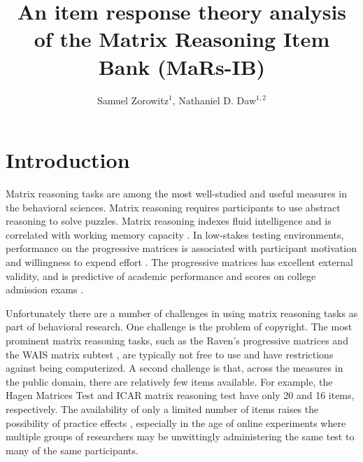 \documentclass[a4paper,man,natbib]{apa6}
\title{An item response theory analysis of the Matrix Reasoning Item Bank (MaRs-IB)}
\author{Samuel Zorowitz$^1$, Nathaniel D. Daw$^{1,2}$}
\affiliation{$^1$Princeton Neuroscience Institute, Princeton University, USA\\$^2$Department of Psychology, Princeton University, USA}
\begin{document}
\maketitle

\section{Introduction}

Matrix reasoning tasks are among the most well-studied and useful measures in the behavioral sciences. Matrix reasoning requires participants to use abstract reasoning to solve puzzles. Matrix reasoning indexes fluid intelligence and is correlated with working memory capacity \citep{conway2002latent, kane2004generality, unsworth2005working, salthouse2014relations}. In low-stakes testing environments, performance on the progressive matrices is associated with participant motivation and willingness to expend effort \citep{gignac2018moderate, gignac2019maximum}. The progressive matrices has excellent external validity, and is predictive of academic performance \citep{roth2015intelligence} and scores on college admission exams \citep{frey2004scholastic, koenig2008act}. %

Unfortunately there are a number of challenges in using matrix reasoning tasks as part of behavioral research. One challenge is the problem of copyright. The most prominent matrix reasoning tasks, such as the Raven's progressive matrices \citep{raven2003raven} and the WAIS matrix subtest \citep{wechsler1999wechsler}, are typically not free to use and have restrictions against being computerized. A second challenge is that, across the measures in the public domain, there are relatively few items available. For example, the Hagen Matrices Test \citep{heydasch2014hagen} and ICAR matrix reasoning test \citep{condon2014international} have only 20 and 16 items, respectively. The availability of only a limited number of items raises the possibility of practice effects \citep{ng1974applicability, bors2003effect}, especially in the age of online experiments where multiple groups of researchers may be unwittingly administering the same test to many of the same participants.
\end{document}
